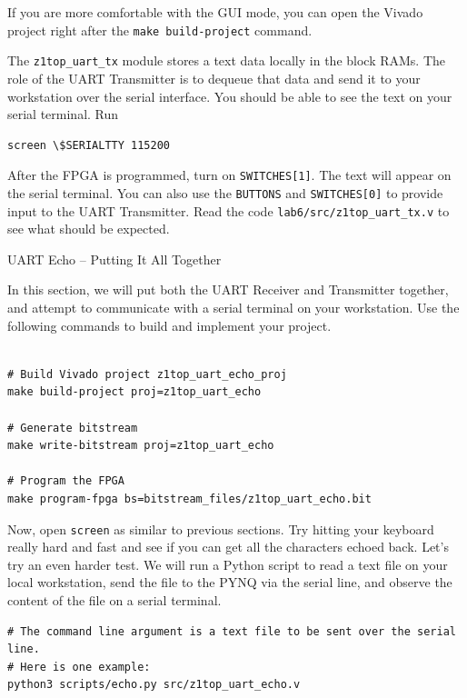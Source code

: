 \documentclass[11pt]{article}
\makeatletter
\renewcommand{\subsection}
{\@startsection {subsection}{1}{0pt}
 {-1ex}
 {0.5ex}
 {\bfseries\normalsize}}
\makeatother
\begin{document}
If you are more comfortable with the GUI mode, you can open the Vivado project right after the \texttt{make build-project} command.

The \verb|z1top_uart_tx| module stores a text data locally in the block RAMs. The role of the UART Transmitter is to dequeue that data and send it to your workstation over the serial interface. You should be able to see the text on your serial terminal. Run

\begin{verbatim}
screen \$SERIALTTY 115200
\end{verbatim}

After the FPGA is programmed, turn on \verb|SWITCHES[1]|. The text will appear on the serial terminal. You can also use the \verb|BUTTONS| and \verb|SWITCHES[0]| to provide input to the UART Transmitter. Read the code \verb|lab6/src/z1top_uart_tx.v| to see what should be expected.

\subsection{UART Echo -- Putting It All Together}

In this section, we will put both the UART Receiver and Transmitter together, and attempt to communicate with a serial terminal on your workstation. Use the following commands to build and implement your project.

\begin{verbatim}

# Build Vivado project z1top_uart_echo_proj
make build-project proj=z1top_uart_echo

# Generate bitstream
make write-bitstream proj=z1top_uart_echo

# Program the FPGA
make program-fpga bs=bitstream_files/z1top_uart_echo.bit
\end{verbatim}

Now, open \verb|screen| as similar to previous sections. Try hitting your keyboard really hard and fast and see if you can get all the characters echoed back. Let's try an even harder test. We will run a Python script to read a text file on your local workstation, send the file to the PYNQ via the serial line, and observe the content of the file on a serial terminal.

\begin{verbatim}
# The command line argument is a text file to be sent over the serial line.
# Here is one example:
python3 scripts/echo.py src/z1top_uart_echo.v
\end{verbatim}
\end{document}

